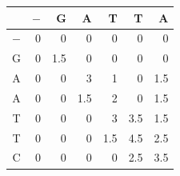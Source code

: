 \begin{tabular}{crrrrrr}\toprule
 & $-$ & G & A & T & T & A\\\midrule
$-$ & 0 & 0 & 0 & 0 & 0 & 0\\
G & 0 & 1.5 & 0 & 0 & 0 & 0\\
A & 0 & 0 & 3 & 1 & 0 & 1.5\\
A & 0 & 0 & 1.5 & 2 & 0 & 1.5\\
T & 0 & 0 & 0 & 3 & 3.5 & 1.5\\
T & 0 & 0 & 0 & 1.5 & 4.5 & 2.5\\
C & 0 & 0 & 0 & 0 & 2.5 & 3.5\\
\bottomrule\end{tabular}
